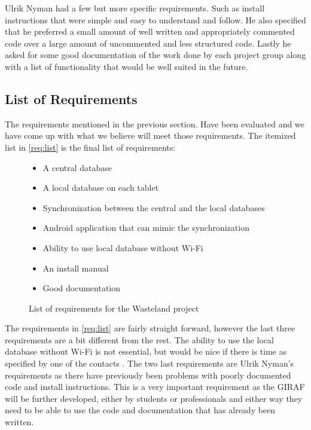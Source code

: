 Ulrik Nyman had a few but more specific requirements. Such as install instructions that were simple and easy to understand and follow. He also specified that he preferred a small amount of well written and appropriately commented code over a large amount of uncommented and less structured code. Lastly he asked for some good documentation of the work done by each project group along with a list of functionality that would be well suited in the future. 




\subsection{List of Requirements} %
\label{sub:list_of_requirements}
The requirements mentioned in the previous section. Have been evaluated and we have come up with what we believe will meet those requirements. The itemized list in \autoref{req:list} is the final list of requirements:

\begin{figure}[htpb]
	\label{req:list}
	\begin{itemize}
		\item A central database
		\item A local database on each tablet		
		\item Synchronization between the central and the local databases
		\item Android application that can mimic the synchronization
		\item Ability to use local database without Wi-Fi
		\item An install manual
		\item Good documentation
	\end{itemize}
	\caption{List of requirements for the Wasteland project}
\end{figure}

The requirements in \autoref{req:list} are fairly straight forward, however the last three requirements are a bit different from the rest. The ability to use the local database without Wi-Fi is not essential, but would be nice if there is time as specified by one of the contacts . The two last requirements are Ulrik Nyman's requirements as there have previously been problems with poorly documented code and install instructions. This is a very important requirement as the GIRAF will be further developed, either by students or professionals and either way they need to be able to use the code and documentation that has already been written.
